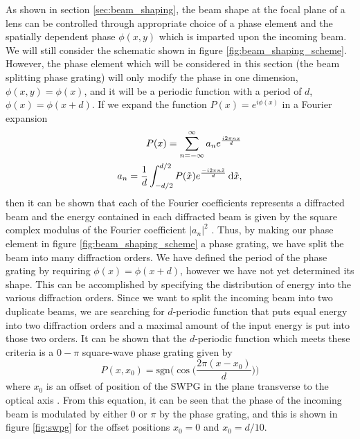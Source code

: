 As shown in section \ref{sec:beam_shaping}, the beam shape at the focal plane of a lens can be controlled through appropriate choice of a phase element and the spatially dependent phase $\phi(x,y)$ which is imparted upon the incoming beam.  We will still consider the schematic shown in figure \ref{fig:beam_shaping_scheme}.  However, the phase element which will be considered in this section (the beam splitting phase grating) will only modify the phase in one dimension, $\phi(x,y)=\phi(x)$, and it will be a periodic function with a period of $d$, $\phi(x)=\phi(x+d)$. If we expand the function $P(x)=e^{i\phi(x)}$ in a Fourier expansion
\begin{align}
\label{eqn:Fourier_coeff_def}
	P(x) = \sum_{n=-\infty}^{\infty}a_n e^{\frac{i2\pi n x }{d}}\\
	a_n = \frac{1}{d}\int_{-d/2}^{d/2} P(\tilde{x})e^{\frac{-i2\pi n\tilde{x}}{d}}\mathop{}\!\mathrm{d}\tilde{x},
\end{align}
then it can be shown that each of the Fourier coefficients represents a diffracted beam and the energy contained in each diffracted beam is given by the square complex modulus of the Fourier coefficient $\rvert a_n\rvert^2$ \cite{romeroTheoryOptimalBeam2007}.  Thus, by making our phase element in figure \ref{fig:beam_shaping_scheme} a phase grating, we have split the beam into many diffraction orders.  We have defined the period of the phase grating by requiring $\phi(x)=\phi(x+d)$, however we have not yet determined its shape.  This can be accomplished by specifying the distribution of energy into the various diffraction orders.  Since we want to split the incoming beam into two duplicate beams, we are searching for $d$-periodic function that puts equal energy into two diffraction orders and a maximal amount of the input energy is put into those two orders. It can be shown that the $d$-periodic function which meets these criteria is a $0-\pi$ square-wave phase grating given by
\begin{equation}
\label{eqn:swpg}
	P(x,x_0) = \mathrm{sgn}\Bigg( \cos\bigg( \frac{2\pi(x-x_0)}{d}\bigg)\Bigg)
\end{equation} 
where $x_0$ is an offset of position of the SWPG in the plane transverse to the optical axis \cite{camperHighRelativephasePrecision2019, romeroMathematicalTheoryLaser2010}. From this equation, it can be seen that the phase of the incoming beam is modulated by either $0$ or $\pi$ by the phase grating, and this is shown in figure \ref{fig:swpg} for the offset positions $x_0=0$ and $x_0=d/10$.


